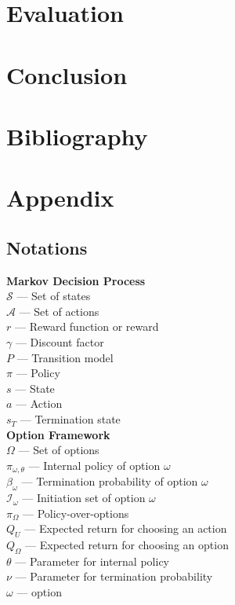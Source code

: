\documentclass{article}
\begin{document}
	\section{Evaluation}
	\section{Conclusion}
	\section{Bibliography}
	
	
	\section{Appendix}
	\subsection*{Notations}
	{\bfseries Markov Decision Process}\\
	$\mathcal{S}$ --- Set of states\\
	$\mathcal{A}$ --- Set of actions\\
	$r$ --- Reward function or reward\\
	$\gamma$ --- Discount factor\\
	$P$ --- Transition model\\
	$\pi$ --- Policy\\
	$s$ --- State\\
	$a$ --- Action\\
	$s_T$ --- Termination state\\
	{\bfseries Option Framework}\\
	$\Omega$ --- Set of options\\
	$\pi_{\omega,\theta}$ --- Internal policy of option $\omega$\\
	$\beta_\omega$ --- Termination probability of option $\omega$\\
	$\mathcal{I}_\omega$ --- Initiation set of option $\omega$\\
	$\pi_\Omega$ --- Policy-over-options\\
	$Q_U$ --- Expected return for choosing an action\\
	$Q_\Omega$ --- Expected return for choosing an option\\
	$\theta$ --- Parameter for internal policy\\
	$\nu$ --- Parameter for termination probability\\
	$\omega$ --- option\\
\end{document}
